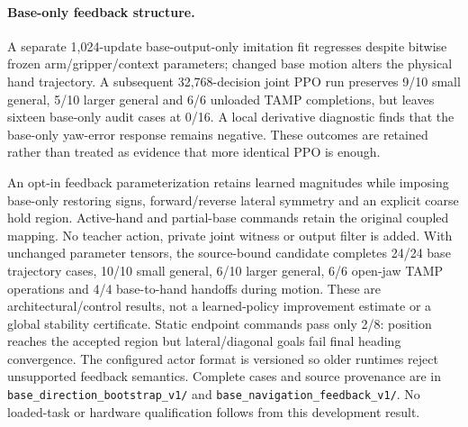 \paragraph{Base-only feedback structure.}
A separate 1,024-update base-output-only imitation fit regresses despite
bitwise frozen arm/gripper/context parameters; changed base motion alters the
physical hand trajectory. A subsequent 32,768-decision joint PPO run preserves
9/10 small general, 5/10 larger general and 6/6 unloaded TAMP completions, but
leaves sixteen base-only audit cases at 0/16. A local derivative diagnostic
finds that the base-only yaw-error response remains negative. These outcomes
are retained rather than treated as evidence that more identical PPO is enough.

An opt-in feedback parameterization retains learned magnitudes while imposing
base-only restoring signs, forward/reverse lateral symmetry and an explicit
coarse hold region. Active-hand and partial-base commands retain the original
coupled mapping. No teacher action, private joint witness or output filter is
added. With unchanged parameter tensors, the source-bound candidate completes
24/24 base trajectory cases, 10/10 small general, 6/10 larger general, 6/6
open-jaw TAMP operations and 4/4 base-to-hand handoffs during motion. These
are architectural/control results, not a learned-policy improvement estimate
or a global stability certificate. Static endpoint commands pass only 2/8:
position reaches the accepted region but lateral/diagonal goals fail final
heading convergence. The configured actor format is versioned so older runtimes
reject unsupported feedback semantics. Complete cases and source provenance
are in \texttt{base\_direction\_bootstrap\_v1/} and
\texttt{base\_navigation\_feedback\_v1/}. No loaded-task or hardware qualification
follows from this development result.

